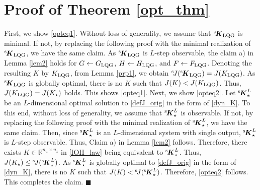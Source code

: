 \documentclass[preprint,5p,times,twocolumn]{elsarticle}
\newcommand{\bm}[1]{{\mbox{\boldmath $#1$}}}
\def\rmsK{{}^{\rm s}\hspace{-0.4mm}}
\def\rmsJ{{}^{\rm s}\hspace{-0.5mm}}
\def\qed{\hfill $\blacksquare$}
\begin{document}
\section{Proof of Theorem \ref{opt_thm}}\label{prf_thm1}
First, we show \eqref{opteq1}. Without loss of generality, we assume that $\rmsK {\bm K}_{\rm LQG}$ is minimal. If not, by replacing the following proof with the minimal realization of $\rmsK {\bm K}_{\rm LQG}$, we have the same claim. As $\rmsK {\bm K}_{\rm LQG}$ is $L$-step observable, the claim a) in Lemma \ref{lem2} holds for $G \leftarrow G_{\rm LQG}$, $H \leftarrow H_{\rm LQG}$, and $F \leftarrow F_{\rm LQG}$. Denoting the resulting $K$  by $K_{\rm LQG}$, from Lemma \ref{prp1}, we obtain $\rmsJ J(\rmsK {\bm K}_{\rm LQG}) = J(K_{\rm LQG})$. As $\rmsK {\bm K}_{\rm LQG}$ is globally optimal, there is no $K$ such that $J(K) < J(K_{\rm LQG})$. Thus, $J(K_{\rm LQG}) = J(K_{\star})$ holds. This shows \eqref{opteq1}. Next, we show \eqref{opteq2}. Let $\rmsK {\bm K}^{L}_{\star}$ be an $L$-dimensional optimal solution to \eqref{defJ_orig} in the form of \eqref{dyn_K}. To this end, without loss of generality, we assume that $\rmsK {\bm K}^{L}_{\star}$ is observable. If not, by replacing the following proof with the minimal realization of $\rmsK {\bm K}^{L}_{\star}$, we have the same claim. Then, since $\rmsK {\bm K}^{L}_{\star}$ is an $L$-dimensional system with single output, $\rmsK {\bm K}^{L}_{\star}$ is $L$-step observable. Thus, Claim a) in Lemma \ref{lem2} follows. Therefore, there exists $K \in \mathbb R^{n_u \times n_z}$ in \eqref{IOH_law} being equivalent to $\rmsK {\bm K}^{L}_{\star}$. Thus, $J(K_{\star}) \leq \rmsJ J(\rmsK {\bm K}^{L}_{\star})$. As $\rmsK {\bm K}^{L}_{\star}$ is globally optimal to \eqref{defJ_orig} in the form of \eqref{dyn_K}, there is no $K$ such that $J(K) < \rmsJ J(\rmsK {\bm K}^{L}_{\star})$. Therefore, \eqref{opteq2} follows. This completes the claim. \qed
\end{document}
